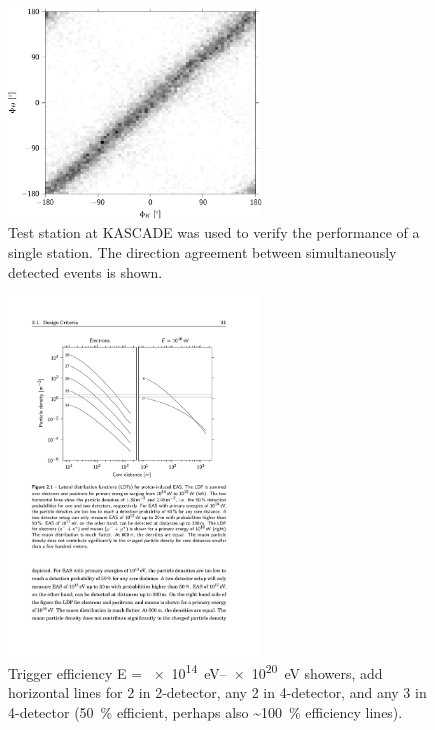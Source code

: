\begin{figure}
    \centering
    \includegraphics[width=0.6\textwidth]
                    {plots/experiment/azimuth_kascade_minn1}
    \caption{Test station at KASCADE was used to verify the performance of a single station. The direction agreement between simultaneously detected events is shown.}
    \label{fig:azimuth_kascade_minn1}
\end{figure}

\begin{figure}
    \centering
    \includegraphics[width=0.6\textwidth]
                    {plots/experiment/ldf_energies}
    \caption{Trigger efficiency E = \SIrange{e14}{e20}{\eV} showers, add horizontal lines for 2 in 2-detector, any 2 in 4-detector, and any 3 in 4-detector (\SI{50}{\percent} efficient, perhaps also \SI{~100}{\percent} efficiency lines).}
    \label{fig:ldf_energies2}
\end{figure}


